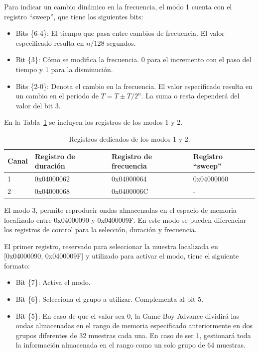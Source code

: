 {Para indicar un cambio dinámico en la frecuencia, el modo 1 cuenta con el registro ``sweep'', que tiene los siguientes bits:

\begin{itemize}
	\item Bits \{6-4\}: El tiempo que pasa entre cambios de frecuencia. El valor especificado resulta en $n/128$ segundos.
	\item Bit \{3\}: Cómo se modifica la frecuencia. 0 para el incremento con el paso del tiempo y 1 para la disminución.
	\item Bits \{2-0\}: Denota el cambio en la frecuencia. El valor especificado resulta en un cambio en el periodo de $T=T\pm{}T/2^n$. La suma o resta dependerá del valor del bit {3}.
\end{itemize}

En la Tabla~\ref{tab:reg_canal_1_2} se incluyen los registros de los modos 1 y 2.

\begin{table}[h]
	\centering
	\begin{tabular}{| l | l | l | l |}
		\hline
		\textbf{Canal} & \textbf{Registro de duración} & \textbf{Registro de frecuencia} & \textbf{Registro ``sweep''} \\ \hline
		1 & 0x04000062 & 0x04000064 & 0x04000060 \\ \hline
		2 & 0x04000068 & 0x0400006C & - \\ \hline
	\end{tabular}
	\caption{Registros dedicados de los modos 1 y 2.}\label{tab:reg_canal_1_2}
\end{table}
\FloatBarrier{}

El modo 3, permite reproducir ondas almacenadas en el espacio de memoria localizado entre 0x04000090 y 0x0400009F. En este modo se pueden diferenciar los registros de control para la selección, duración y frecuencia.

El primer registro, reservado para seleccionar la muestra localizada en [0x04000090, 0x0400009F] y utilizado para activar el modo, tiene el siguiente formato:

\begin{itemize}
	\item Bit \{7\}: Activa el modo.
	\item Bit \{6\}: Selecciona el grupo a utilizar. Complementa al bit {5}.
	\item Bit \{5\}: En caso de que el valor sea 0, la Game Boy Advance dividirá las ondas almacenadas en el rango de memoria especificado anteriormente en dos grupos diferentes de 32 muestras cada una. En caso de ser 1, gestionará toda la información almacenada en el rango como un solo grupo de 64 muestras.
\end{itemize}

}
